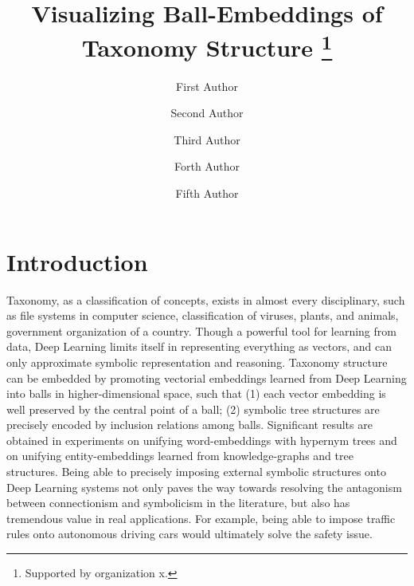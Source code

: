 \documentclass[runningheads]{llncs}
\begin{document}
%
\title{Visualizing  Ball-Embeddings of Taxonomy Structure \thanks{Supported by organization x.}}
%
%
\author{First Author \and
Second Author  \and
Third Author  \and
Forth Author  \and
Fifth Author}
%
%
%
\maketitle              %

\begin{abstract}
 
\end{abstract}
%
%
%
\section{Introduction}

Taxonomy, as a classification of concepts, exists in almost every disciplinary, such as file systems in computer science, classification of viruses, plants, and animals, government organization of a country. Though a powerful tool for learning from data, Deep Learning limits itself in representing everything as vectors, and can only approximate symbolic representation and reasoning. Taxonomy structure can be embedded by promoting vectorial embeddings learned from Deep Learning into balls in higher-dimensional space, such that (1) each vector embedding is well preserved by the central point of a ball; (2) symbolic tree structures are precisely encoded by inclusion relations among balls. Significant results are obtained in experiments on unifying word-embeddings with hypernym trees and on unifying entity-embeddings learned from knowledge-graphs and tree structures. Being able to precisely imposing external symbolic structures onto Deep Learning systems not only paves the way towards resolving the antagonism between connectionism and symbolicism in the literature, but also has tremendous value in real applications. For example, being able to impose traffic rules onto autonomous driving cars would ultimately solve the safety issue.  
\end{document}
